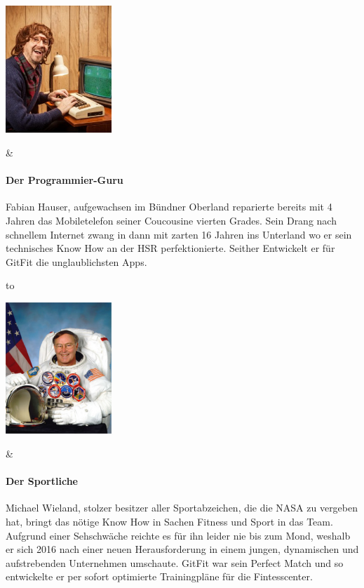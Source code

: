 \begin{tabu}
	\begin{center}
		\includegraphics[width=0.3\textwidth]{images/team/derprogrammierer}
	\end{center}
	&
	\paragraph{Der Programmier-Guru}
	Fabian Hauser, aufgewachsen im Bündner Oberland reparierte bereits mit 4 Jahren das Mobiletelefon seiner Coucousine vierten Grades. Sein Drang nach schnellem Internet zwang in dann mit zarten 16 Jahren ins Unterland wo er sein technisches Know How an der HSR perfektionierte. Seither Entwickelt er für GitFit die unglaublichsten Apps. \\
	
	
\end{tabu} 

\begin{tabu} to \linewidth {X X}
	\begin{center}
		\includegraphics[width=0.3\textwidth]{images/team/dersportliche}
	\end{center}
	&
	\paragraph{Der Sportliche} 
	Michael Wieland, stolzer besitzer aller Sportabzeichen, die die NASA zu vergeben hat, bringt das nötige Know How in Sachen Fitness und Sport in das Team. Aufgrund einer Sehschwäche reichte es für ihn leider nie bis zum Mond, weshalb er sich 2016 nach einer neuen Herausforderung in einem jungen, dynamischen und aufstrebenden Unternehmen umschaute. GitFit war sein Perfect Match und so entwickelte er per sofort optimierte Trainingpläne für die Fintesscenter. \\
\end{tabu} 

